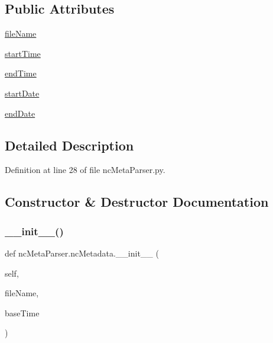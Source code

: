 \subsection*{Public Attributes}
\begin{DoxyCompactItemize}
\item 
\mbox{\hyperlink{classnc_meta_parser_1_1nc_metadata_a119acc5dbb77f035d27533b6fbe4a8c1}{file\+Name}}
\item 
\mbox{\hyperlink{classnc_meta_parser_1_1nc_metadata_a52732ba284ca71b97931e928235fd36d}{start\+Time}}
\item 
\mbox{\hyperlink{classnc_meta_parser_1_1nc_metadata_ad84ec881e775ad4d096d41bd02847200}{end\+Time}}
\item 
\mbox{\hyperlink{classnc_meta_parser_1_1nc_metadata_abd8cbd92387417d12f948203e93c0946}{start\+Date}}
\item 
\mbox{\hyperlink{classnc_meta_parser_1_1nc_metadata_a846e0f0facf648d895d69b869a6e1fb0}{end\+Date}}
\end{DoxyCompactItemize}


\subsection{Detailed Description}


Definition at line 28 of file nc\+Meta\+Parser.\+py.



\subsection{Constructor \& Destructor Documentation}
\mbox{\label{classnc_meta_parser_1_1nc_metadata_aa36a1deb53cfbaee8976287877fa20fb}} 
\subsubsection{\texorpdfstring{\+\_\+\+\_\+init\+\_\+\+\_\+()}{\_\_init\_\_()}}
{\footnotesize\ttfamily def nc\+Meta\+Parser.\+nc\+Metadata.\+\_\+\+\_\+init\+\_\+\+\_\+ (\begin{DoxyParamCaption}\item[{}]{self,  }\item[{}]{file\+Name,  }\item[{}]{base\+Time }\end{DoxyParamCaption})}



